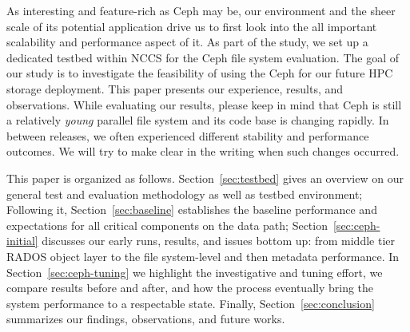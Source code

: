 As interesting and feature-rich as Ceph may be, our environment and the sheer
scale of its potential application drive us to first look into the all
important scalability and performance aspect of it.  As part of the study, we
set up a dedicated testbed within NCCS for the Ceph file system evaluation.
The goal of our study is to investigate the feasibility of using the Ceph for
our future HPC storage deployment. This paper presents our experience,
results, and observations.  While evaluating our results, please keep in mind
that Ceph is still a relatively \textit{young} parallel file system and its
code base is changing rapidly. In between releases, we often experienced
different stability and performance outcomes.  We will try to make clear in
the writing when such changes occurred.

This paper is organized as follows. Section~\ref{sec:testbed} gives an
overview on our general test and evaluation methodology as well as testbed
environment; Following it, Section~\ref{sec:baseline} establishes the baseline
performance and expectations for all critical components on the data path;
Section~\ref{sec:ceph-initial} discusses our early runs, results, and issues
bottom up: from middle tier RADOS object layer to the file system-level and
then metadata performance. In Section~\ref{sec:ceph-tuning} we highlight the
investigative and tuning effort, we compare results before and after, and how
the process eventually bring the system performance to a respectable state.
Finally, Section~\ref{sec:conclusion} summarizes our findings, observations,
and future works.
